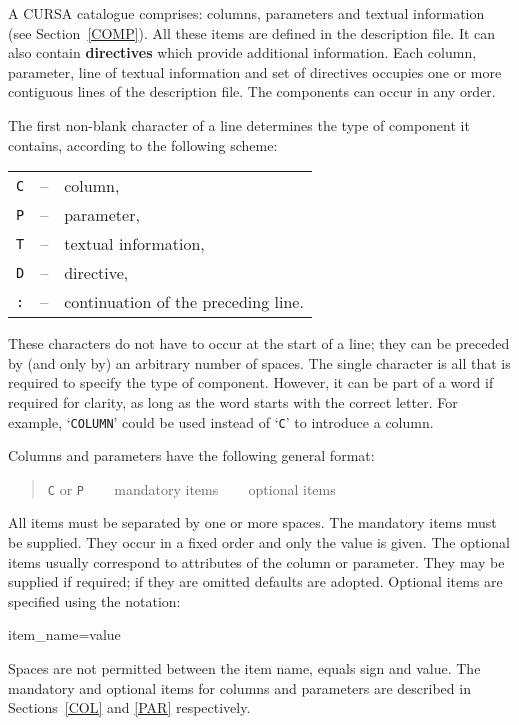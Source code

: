 \documentclass[twoside,11pt]{starlink}
\begin{document}
A CURSA catalogue comprises: columns, parameters and textual information
(see Section~\ref{COMP}).  All these items are defined in the description
file.  It can also contain \textbf{directives} which provide additional
information.  Each column, parameter, line of textual information and set
of directives occupies one or more contiguous lines of the description
file.  The components can occur in any order.

The first non-blank character of a line determines the type of component
it contains, according to the following scheme:

\begin{tabular}{lcl}
\texttt{C} & -- & column,              \\
\texttt{P} & -- & parameter,           \\
\texttt{T} & -- & textual information, \\
\texttt{D} & -- & directive,           \\
\texttt{:} & -- & continuation of the preceding line.  \\
\end{tabular}

These characters do not have to occur at the start of a line; they can
be preceded by (and only by) an arbitrary number of spaces.  The single
character is all that is required to specify the type of component.
However, it can be part of a word if required for clarity, as long as
the word starts with the correct letter.  For example, `\texttt{COLUMN}'
could be used instead of `\texttt{C}' to introduce a column.

Columns and parameters have the following general format:

\begin{quote}
\texttt{C} or \texttt{P} ~~~ mandatory items ~~~ optional items
\end{quote}

All items must be separated by one or more spaces.  The
mandatory items must be supplied.  They occur in a fixed order and
only the value is given.  The optional items usually
correspond to attributes of the column or parameter.  They may be
supplied if required; if they are omitted defaults are adopted.
Optional items are specified using the notation:

\begin{terminalv}
item_name=value
\end{terminalv}

Spaces are not permitted between the item name, equals sign and value.
The mandatory and optional items for columns and parameters are
described in Sections~\ref{COL} and \ref{PAR} respectively.
\end{document}
